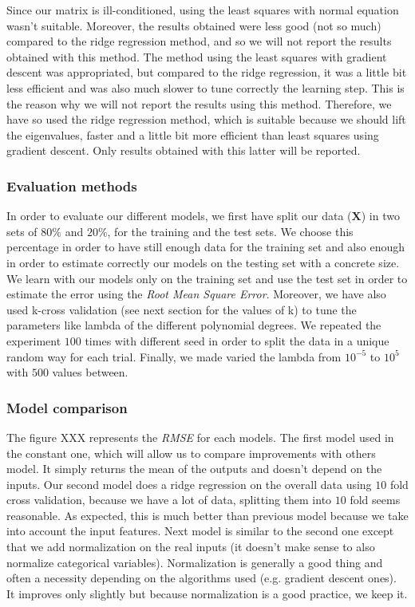 \documentclass{article} %
\begin{document}
Since our matrix is ill-conditioned, using the least squares with normal equation wasn't suitable. Moreover, the results obtained were less good (not so much) compared to the ridge regression method, and so we will not report the results obtained with this method. The method using the least squares with gradient descent was appropriated, but compared to the ridge regression, it was a little bit less efficient and was also much slower to tune correctly the learning step. This is the reason why we will not report the results using this method. Therefore, we have so used the ridge regression method, which is suitable because we should lift the eigenvalues, faster and a little bit more efficient than least squares using gradient descent. Only results obtained with this latter will be reported.

\subsubsection{Evaluation methods}

In order to evaluate our different models, we first have split our data ($\mathbf{X}$) in two sets of $80\%$ and $20\%$, for the training and the test sets. We choose this percentage in order to have still enough data for the training set and also enough in order to estimate correctly our models on the testing set with a concrete size. We learn with our models only on the training set and use the test set in order to estimate the error using the \textit{Root Mean Square Error}. Moreover, we have also used k-cross validation (see next section for the values of k) to tune the parameters like lambda of the different polynomial degrees. We repeated the experiment $100$ times with different seed in order to split the data in a unique random way for each trial. Finally, we made varied the lambda from $10^{-5}$ to $10^{5}$ with $500$ values between.

\subsubsection{Model comparison}

The figure XXX represents the \textit{RMSE} for each models. The first model used in the constant one, which will allow us to compare improvements with others model. It simply returns the mean of the outputs and doesn't depend on the inputs. Our second model does a ridge regression on the overall data using $10$ fold cross validation, because we have a lot of data, splitting them into $10$ fold seems reasonable. As expected, this is much better than previous model because we take into account the input features. Next model is similar to the second one except that we add normalization on the real inputs (it doesn't make sense to also normalize categorical variables). Normalization is generally a good thing and often a necessity depending on the algorithms used (e.g. gradient descent ones). It improves only slightly but because normalization is a good practice, we keep it.
\end{document}
